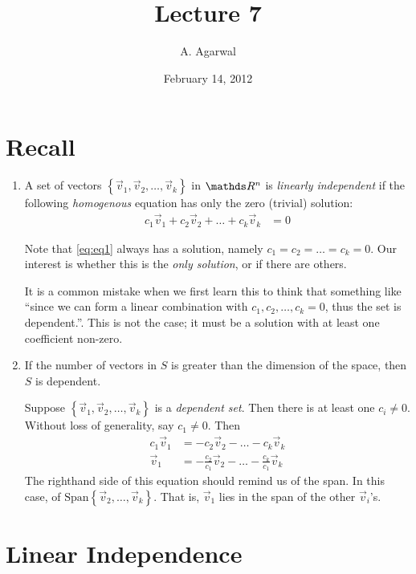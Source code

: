 \documentclass[11pt]{article}
\title{Lecture 7}
\author{A. Agarwal}
\date{February 14, 2012}
\newcommand{\vek}[1]{\vec{#1}}
\begin{document}

\section*{Recall}

\begin{enumerate}
\item{
A set of vectors $\left\{ \vek{v}_1, \vek{v}_2, \dots, \vek{v}_k \right\}$ in $\bbR^n$ is \emph{linearly independent} if the following \emph{homogenous} equation has only the zero (trivial) solution:
\begin{align}
c_1 \vek{v}_1 + c_2 \vek{v}_2 + \dots + c_k \vek{v}_k &= 0
\label{eq:eq1}
\end{align}

Note that \eqref{eq:eq1} always has a solution, namely $c_1 = c_2 = \dots = c_k = 0$. Our interest is whether this is the \emph{only solution}, or if there are others.

It is a common mistake when we first learn this to think that something like ``since we can form a linear combination with $c_1, c_2, \dots, c_k = 0$, thus the set is dependent.''. This is not the case; it must be a solution with at least one coefficient non-zero.
}
\item{
If the number of vectors in $S$ is greater than the dimension of the space, then $S$ is dependent.

Suppose $\left\{ \vek{v}_1, \vek{v}_2, \dots, \vek{v}_k \right\}$ is a \emph{dependent set}. Then there is at least one $c_i \neq 0$. Without loss of generality, say $c_1 \neq 0$. Then
\begin{align*}
c_1 \vek{v}_1 &= - c_2 \vek{v}_2 - \dots - c_k \vek{v}_k
\\
\vek{v}_1 &= -\frac{c_2}{c_1} \vek{v}_2 - \dots - \frac{c_k}{c_1} \vek{v}_k
\end{align*}
The righthand side of this equation should remind us of the span. In this case, of $\text{Span}\left\{ \vek{v}_2, \dots, \vek{v}_k \right\}$. That is, $\vek{v}_1$ lies in the span of the other $\vek{v}_i$'s.
}
\end{enumerate}

\section*{Linear Independence}
\end{document}
